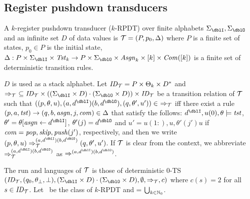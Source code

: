 \subsection{Register pushdown transducers}
\begin{definition}
A $k$-{register pushdown transducer} ($k$-RPDT) over finite alphabets $\Sigma_\dblI,\Sigma_\dblO$ and an infinite set $D$ of data values is
${\cal T}=(P, p_0, \Delta)$ where
$P$ is a finite set of states,
$p_0\in P$ is the initial state,
$\Delta: P\times\Sigma_\dblI\times\Tst_k \to P\times\Sigma_\dblO\times \Asgn_k \times [k]\times \Com([k])$ is a finite set of deterministic transition rules.
\end{definition}
$D$ is used as a stack alphabet.
Let $\mathit{ID}_{\cal T}= P\times \Theta_k\times D^*$
and $\Rightarrow_\calT\ \subseteq \ID_\calT\times ((\Sigma_\dblI\times D)\cdot(\Sigma_\dblO\times D))\times \ID_\calT$ be a transition relation of ${\cal T}$ such that $((p, \theta, u), (a,d^\dblI)(b,d^\dblO), (q, \theta', u'))\in\ \Rightarrow_\calT$ iff
there exist a rule $(p, a, \mathit{tst}) \to (q, b, \mathit{asgn}, j, \mathit{com}) \in \Delta$
that satisfy the follows:
$d^\dblI, u(0), \theta\models\tst$, $\theta' = \theta[\asgn\leftarrow d^\dblI]$, $\theta'(j) = d^\dblO$ and
$u'= u(1:),u,\theta'(j')u$ if $\mathit{com}=\mathit{pop},\mathit{skip},\mathit{push}(j')$, respectively,
and then we write $(p, \theta, u) \done_{\calT}^{(a,d^\dblI)(b,d^\dblO)}(q, \theta', u')$.
If ${\cal T}$ is clear from the context,
we abbreviate
$\done_{\calT}^{(a,d^\dblI)(b,d^\dblO)}$ as $\done^{(a,d^\dblI)(b,d^\dblO)}$.

The run and languages of ${\cal T}$ is those of deterministic $0$-TS $(\ID_\calT, (q_0,\theta_\bot, \bot), (\Sigma_\dblI\times D)\cdot(\Sigma_\dblO\times D), \emptyset, \Rightarrow_\calT, c)$ where $c(s)=2$ for all $s\in\mathit{ID}_{\cal T}$.
Let \RPDTk\ be the class of $k$-RPDT and \RPDT = $\bigcup_{k\in\mathbb{N}_0}$\RPDTk.

